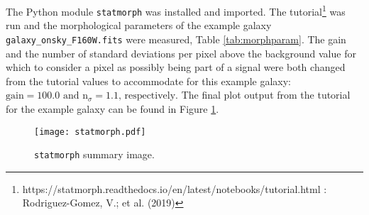 \documentclass[10pt, preprint]{aastex}
\begin{document}
The Python module \texttt{statmorph} was installed and imported. The tutorial\footnote{https://statmorph.readthedocs.io/en/latest/notebooks/tutorial.html : Rodriguez-Gomez, V.; et al. (2019)} was run and the morphological parameters of the example galaxy \texttt{galaxy\_onsky\_F160W.fits} were measured, Table \ref{tab:morphparam}. The gain and the number of standard deviations per pixel above the background value for which to consider a pixel as possibly being part of a signal were both changed from the tutorial values to accommodate for this example galaxy:
$ \textrm{gain} = 100.0\textrm{ and } \textrm{n}_{\sigma} = 1.1\textrm{, respectively.}$ The final plot output from the tutorial for the example galaxy can be found in Figure \ref{fig:stat}.
\vspace{-0.5\baselineskip}

\begin{figure}[H]
    \centering
    \texttt{[image: statmorph.pdf]}
    \caption{\texttt{statmorph} summary image.}
    \label{fig:stat}
\end{figure}
\end{document}
